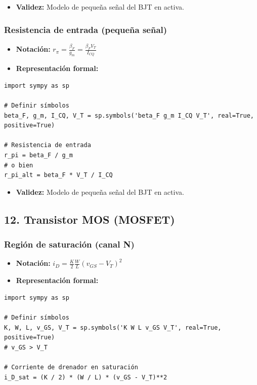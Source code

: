 \documentclass[11pt,a4paper]{article}
\begin{document}
\begin{itemize}[leftmargin=*,topsep=2pt,itemsep=1pt]
  \item \textbf{Validez:} Modelo de pequeña señal del BJT en activa.
\end{itemize}


\subsubsection*{Resistencia de entrada (pequeña señal)}


\begin{itemize}[leftmargin=*,topsep=2pt,itemsep=1pt]
  \item \textbf{Notación:} $r_\pi = \frac{\beta_F}{g_m} = \frac{\beta_F V_T}{I_{CQ}}$
  \item \textbf{Representación formal:}
\end{itemize}


\begin{lstlisting}
import sympy as sp

# Definir símbolos
beta_F, g_m, I_CQ, V_T = sp.symbols('beta_F g_m I_CQ V_T', real=True, positive=True)

# Resistencia de entrada
r_pi = beta_F / g_m
# o bien
r_pi_alt = beta_F * V_T / I_CQ
\end{lstlisting}


\begin{itemize}[leftmargin=*,topsep=2pt,itemsep=1pt]
  \item \textbf{Validez:} Modelo de pequeña señal del BJT en activa.
\end{itemize}


\subsection*{12. Transistor MOS (MOSFET)}


\subsubsection*{Región de saturación (canal N)}


\begin{itemize}[leftmargin=*,topsep=2pt,itemsep=1pt]
  \item \textbf{Notación:} $i_D = \frac{K}{2} \frac{W}{L} (v_{GS} - V_T)^2$
  \item \textbf{Representación formal:}
\end{itemize}


\begin{lstlisting}
import sympy as sp

# Definir símbolos
K, W, L, v_GS, V_T = sp.symbols('K W L v_GS V_T', real=True, positive=True)
# v_GS > V_T

# Corriente de drenador en saturación
i_D_sat = (K / 2) * (W / L) * (v_GS - V_T)**2
\end{lstlisting}
\end{document}

